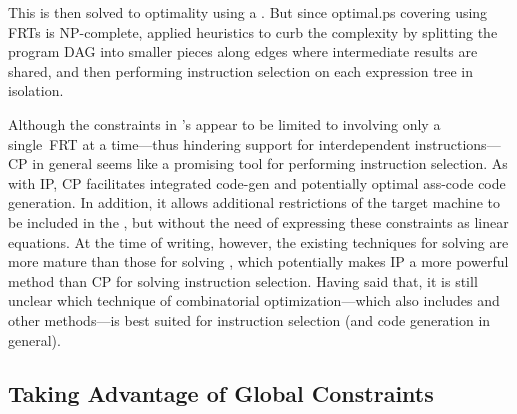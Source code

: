 This \tCPmodel is then solved to optimality using a \tCPsolver.
%
But since
\gls{optimal.ps} covering using \glspl{FRT} is NP-complete,
\citeauthor{Bashford1999} applied heuristics to curb the complexity by splitting
the \gls{program DAG} into smaller pieces along \glspl{edge} where intermediate
results are shared, and then performing \gls{instruction selection} on each
\gls{expression tree} in isolation.

Although the constraints in \citeauthor{Bashford1999}'s \tCPmodel appear to be
limited to involving only a single~\gls{FRT} at a time---thus hindering support
for \glspl{interdependent instruction}---\glsdesc{CP} in general seems like a
promising tool for performing \gls{instruction selection}.
%
As with \glsdesc{IP},
\glsdesc{CP} facilitates \gls{integrated code-gen} and potentially \gls{optimal
  ass-code} \gls{code generation}.
%
In addition, it allows additional
restrictions of the \gls{target machine} to be included in the \tCPmodel, but
without the need of expressing these constraints as linear equations.
%
At the
time of writing, however, the existing techniques for solving \tIPmodels are
more mature than those for solving \tCPmodels, which potentially makes
\glsdesc{IP} a more powerful method than \glsdesc{CP} for solving
\gls{instruction selection}.
%
Having said that, it is still unclear which
technique of combinatorial optimization---which also includes  and other methods---is best suited for \gls{instruction selection}
(and code generation in general).


\subsection{Taking Advantage of Global Constraints}

